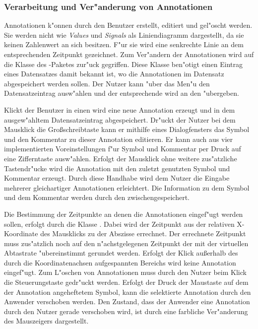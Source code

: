 
\subsubsection{Verarbeitung und Ver"anderung von Annotationen}
\label{sec:edit_annotations}

Annotationen k"onnen durch den Benutzer erstellt, editiert und gel"oscht werden.
Sie werden nicht wie \emph{Values} und \emph{Signals} als Liniendiagramm dargestellt, da sie keinen Zahlenwert an sich besitzen.
F"ur sie wird eine senkrechte Linie an dem entsprechenden Zeitpunkt gezeichnet.
Zum Ver"andern der Annotationen wird auf die Klasse  des -Paketes zur"uck gegriffen.
Diese Klasse ben"otigt einen Eintrag eines Datensatzes damit bekannt ist, wo die Annotationen im Datensatz abgespeichert werden sollen.
Der Nutzer kann "uber das Men"u den Datensatzeintrag ausw"ahlen und der entsprechende  wird an den  "ubergeben.

Klickt der Benutzer in einen  wird eine neue Annotation erzeugt und in dem ausgew"ahltem Datensatzeintrag abgespeichert.
Dr"uckt der Nutzer bei dem Mausklick die Gro{\ss}schreibtaste kann er mithilfe eines Dialogfensters das Symbol und den Kommentar zu dieser Annotation editieren.
Er kann auch aus vier implementierten Voreinstellungen f"ur Symbol und Kommentar per Druck auf eine Zifferntaste ausw"ahlen.
Erfolgt der Mausklick ohne weitere zus"atzliche Tastendr"ucke wird die Annotation mit den zuletzt genutzten Symbol und Kommentar erzeugt.
Durch diese Handhabe wird dem Nutzer die Eingabe mehrerer gleichartiger Annotationen erleichtert.
Die Information zu dem Symbol und dem Kommentar werden durch den  zwischengespeichert.

Die Bestimmung der Zeitpunkte an denen die Annotationen eingef"ugt werden sollen, erfolgt durch die Klasse .
Dabei wird der Zeitpunkt aus der relativen X-Koordinate des Mausklicks zu der Abszisse errechnet.
Der errechnete Zeitpunkt muss zus"atzlich noch auf den n"achstgelegenen Zeitpunkt der mit der virtuellen Abtastrate "ubereinstimmt gerundet werden.
Erfolgt der Klick au{\ss}erhalb des durch die Koordinatenachsen aufgespannten Bereichs wird keine Annotation eingef"ugt.
Zum L"oschen von Annotationen muss durch den Nutzer beim Klick die Steuerungstaste gedr"uckt werden.
Erfolgt der Druck der Maustaste auf dem der Annotation angeheftetem Symbol, kann die selektierte Annotation durch den Anwender verschoben werden.
Den Zustand, dass der Anwender eine Annotation durch den Nutzer gerade verschoben wird, ist durch eine farbliche Ver"anderung des Mauszeigers dargestellt.

